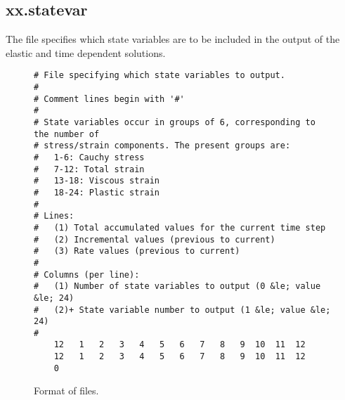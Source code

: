 \subsection{xx.statevar}

The  file specifies which state variables are to
be included in the output of the elastic and time dependent solutions.

\begin{figure}
  \begin{center}
\begin{verbatim}
# File specifying which state variables to output.
#
# Comment lines begin with '#'
#
# State variables occur in groups of 6, corresponding to the number of
# stress/strain components. The present groups are:
#   1-6: Cauchy stress
#   7-12: Total strain
#   13-18: Viscous strain
#   18-24: Plastic strain
#
# Lines:
#   (1) Total accumulated values for the current time step
#   (2) Incremental values (previous to current)
#   (3) Rate values (previous to current)
#
# Columns (per line):
#   (1) Number of state variables to output (0 &le; value &le; 24)
#   (2)+ State variable number to output (1 &le; value &le; 24)
#
    12   1   2   3   4   5   6   7   8   9  10  11  12
    12   1   2   3   4   5   6   7   8   9  10  11  12
    0
\end{verbatim}
    \caption{Format of  files.}
  \end{center}
\end{figure}
